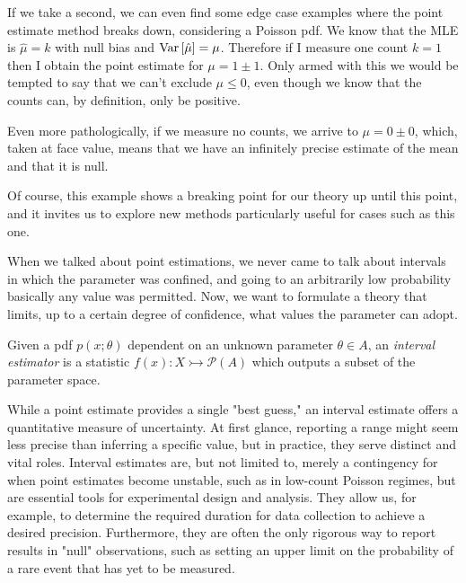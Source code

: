 \begin{example}
	If we take a second, we can even find some edge case examples where the point estimate method breaks down, considering a Poisson pdf. We know that the MLE is $\hat\mu=k$ with null bias and $\operatorname{Var}\left[\hat\mu\right] = \mu$. Therefore if I measure one count $k=1$ then I obtain the point estimate for $\mu = 1\pm1$. Only armed with this we would be tempted to say that we can't exclude $\mu\leq0$, even though we know that the counts can, by definition, only be positive.
	
	Even more pathologically, if we measure no counts, we arrive to $\mu=0\pm0$, which, taken at face value, means that we have an infinitely precise estimate of the mean and that it is null. 
	
	Of course, this example shows a breaking point for our theory up until this point, and it invites us to explore new methods particularly useful for cases such as this one.
\end{example}


When we talked about point estimations, we never came to talk about intervals in which the parameter was confined, and going to an arbitrarily low probability basically any value was permitted. Now, we want to formulate a theory that limits, up to a certain degree of confidence, what values the parameter can adopt. 

\begin{definition}
	Given a pdf $p(x;\theta)$ dependent on an unknown parameter $\theta\in A$, an \emph{interval estimator} is a statistic $f(x): X\rightarrowtail \mathcal{P}(A)$ which outputs a subset of the parameter space.
\end{definition}

While a point estimate provides a single "best guess," an interval estimate offers a quantitative measure of uncertainty. At first glance, reporting a range might seem less precise than inferring a specific value, but in practice, they serve distinct and vital roles. Interval estimates are, but not limited to, merely a contingency for when point estimates become unstable, such as in low-count Poisson regimes, but are essential tools for experimental design and analysis. They allow us, for example, to determine the required duration for data collection to achieve a desired precision. Furthermore, they are often the only rigorous way to report results in "null" observations, such as setting an upper limit on the probability of a rare event that has yet to be measured.

